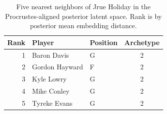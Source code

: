 \begin{table}[htbp]
  \centering\small
  \begin{tabular}{rllc}
    \toprule
    Rank & Player & Position & Archetype \\
    \midrule
    1 & Baron Davis & G & 2 \\
    2 & Gordon Hayward & F & 2 \\
    3 & Kyle Lowry & G & 2 \\
    4 & Mike Conley & G & 2 \\
    5 & Tyreke Evans & G & 2 \\
    \bottomrule
  \end{tabular}
  \caption{Five nearest neighbors of Jrue Holiday in the Procrustes-aligned posterior latent space. Rank is by posterior mean embedding distance.}
\end{table}

